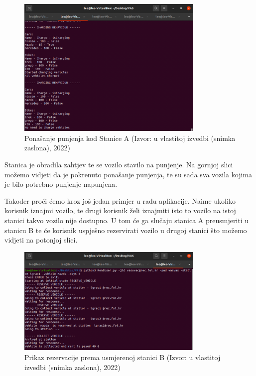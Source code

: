 \documentclass{foi}
\begin{document}
\begin{figure}[H]
	\centering
	\includegraphics[width=0.8\textwidth]{slike/vas10}
	\caption{Ponašanje punjenja kod Stanice A (Izvor: u vlastitoj izvedbi (snimka zaslona), 2022)}
\end{figure}

Stanica je obradila zahtjev te se vozilo stavilo na punjenje. Na gornjoj slici možemo vidjeti da je pokrenuto ponašanje punjenja, te su sada sva vozila kojima je bilo potrebno punjenje napunjena.

Također proći ćemo kroz još jedan primjer u radu aplikacije. Naime ukoliko korisnik iznajmi vozilo, te drugi korisnik želi iznajmiti isto to vozilo na istoj stanici takvo vozilo nije dostupno. U tom će ga slučaju stanica A preusmjeriti u stanicu B te će korisnik uspješno rezervirati vozilo u drugoj stanici što možemo vidjeti na potonjoj slici.

\begin{figure}[H]
	\centering
	\includegraphics[width=0.8\textwidth]{slike/vas11}
	\caption{Prikaz rezervacije prema usmjerenoj stanici B (Izvor: u vlastitoj izvedbi (snimka zaslona), 2022)}
\end{figure}
\end{document}
